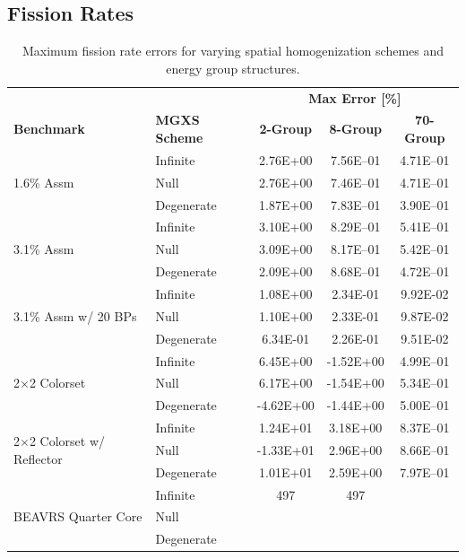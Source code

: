 \subsection{Fission Rates}
\label{subsec:chap8-fiss-rates}

\begin{table}[h!]
  \centering
  \caption[Maximum OpenMOC fission rate errors]{Maximum fission rate errors for varying spatial homogenization schemes and energy group structures.}
  \small
  \label{table:chap8-openmoc-max-fiss-rates}
  \vspace{6pt}
  \begin{tabular}{l l c c c}
  \toprule
  \rowcolor{lightgray}
  & & \multicolumn{3}{c}{\cellcolor{lightgray} \textbf{Max Error [\%]}} \\
  \multirow{-2}{*}{\cellcolor{lightgray} \bf Benchmark} &
  \multirow{-2}{*}{\cellcolor{lightgray} \bf \ac{MGXS} Scheme} &
  \multicolumn{1}{c}{{\cellcolor{lightgray} \bf 2-Group}} &
  \multicolumn{1}{c}{{\cellcolor{lightgray} \bf 8-Group}} &
  \multicolumn{1}{c}{{\cellcolor{lightgray} \bf 70-Group}} \\
  \midrule
\multirow{3}{*}{\parbox{2.5cm}{1.6\% Assm}} & Infinite & 2.76E+00 & 7.56E--01 & 4.71E--01 \\
& Null & 2.76E+00 & 7.46E--01 & 4.71E--01 \\
& Degenerate & 1.87E+00 & 7.83E--01 & 3.90E--01 \\
  \midrule
\multirow{3}{*}{\parbox{2.5cm}{3.1\% Assm}} & Infinite & 3.10E+00 & 8.29E--01 & 5.41E--01 \\
& Null & 3.09E+00 & 8.17E--01 & 5.42E--01 \\
& Degenerate & 2.09E+00 & 8.68E--01 & 4.72E--01 \\
  \midrule
\multirow{3}{*}{\parbox{2.5cm}{3.1\% Assm w/ 20 BPs}} & Infinite & 1.08E+00 & 2.34E-01 & 9.92E-02 \\
& Null & 1.10E+00 & 2.33E-01 & 9.87E-02 \\
& Degenerate & 6.34E-01 & 2.26E-01 & 9.51E-02 \\
  \midrule
\multirow{3}{*}{\parbox{2.5cm}{2$\times$2 Colorset}} & Infinite & 6.45E+00 & -1.52E+00 & 4.99E--01 \\
& Null & 6.17E+00 & -1.54E+00 & 5.34E--01 \\
& Degenerate & -4.62E+00 & -1.44E+00 & 5.00E--01 \\
  \midrule
\multirow{3}{*}{\parbox{2.5cm}{2$\times$2 Colorset w/ Reflector}} & Infinite & 1.24E+01 & 3.18E+00 & 8.37E--01 \\
& Null & -1.33E+01 & 2.96E+00 & 8.66E--01 \\
& Degenerate & 1.01E+01 & 2.59E+00 & 7.97E--01 \\
  \midrule
  \multirow{3}{*}{\parbox{2cm}{\ac{BEAVRS} Quarter Core}} & Infinite & 497 & 497 & \\
  & Null & & & \\
  & Degenerate & & & \\
  \bottomrule
\end{tabular}
\end{table}

